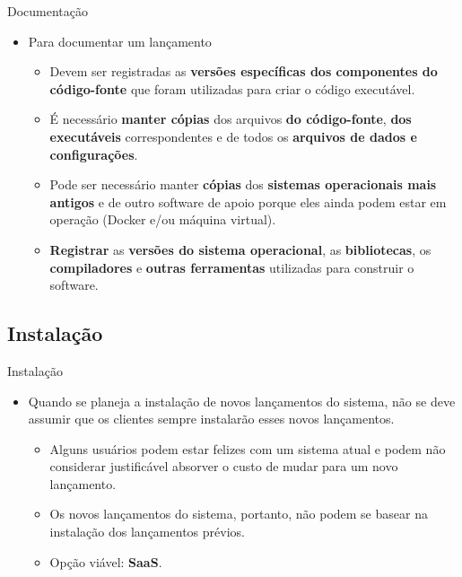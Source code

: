 \documentclass{beamer}
\begin{document}
\begin{frame}{Documentação}
	\begin{itemize}
		\justifying
		\item Para documentar um lançamento
		\begin{itemize}
			\justifying
			\item<1> Devem ser registradas as \textbf{versões específicas dos componentes do código-fonte} que foram utilizadas para criar o código executável.
			\item<2> É necessário \textbf{manter cópias} dos arquivos \textbf{do código-fonte}, \textbf{dos executáveis} correspondentes e de todos os \textbf{arquivos de dados e configurações}.
			\item<3> Pode ser necessário manter \textbf{cópias} dos \textbf{sistemas operacionais mais antigos} e de outro software de apoio porque eles ainda podem estar em operação (Docker e/ou máquina virtual).
			\item<4> \textbf{Registrar} as \textbf{versões do sistema operacional}, as \textbf{bibliotecas}, os \textbf{compiladores} e \textbf{outras ferramentas} utilizadas para construir o software.
		\end{itemize}
	\end{itemize}
\end{frame}

\subsection{Instalação}

\begin{frame}{Instalação}
	\begin{itemize}
		\justifying
		\item Quando se planeja a instalação de novos lançamentos do sistema, não se deve assumir que os clientes sempre instalarão esses novos lançamentos.
		\begin{itemize}
			\justifying
			\item Alguns usuários podem estar felizes com um sistema atual e podem não considerar justificável absorver  o custo de mudar para um novo lançamento.
			\item Os novos lançamentos do sistema, portanto, não podem se basear na instalação dos lançamentos prévios.
			\item Opção viável: \textbf{SaaS}.
		\end{itemize}
	\end{itemize}
\end{frame}
\end{document}
